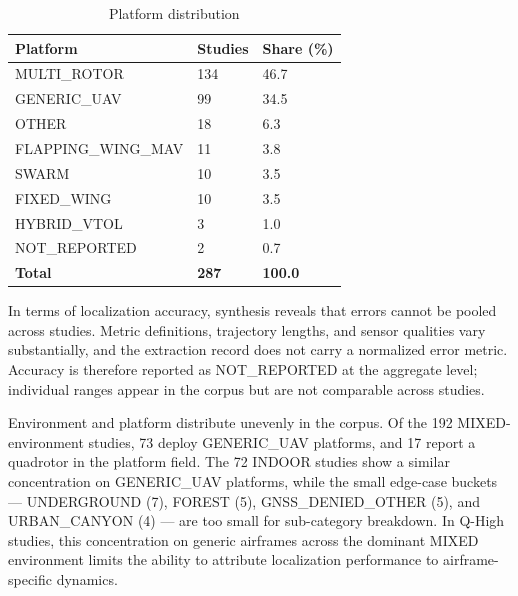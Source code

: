 \documentclass[conference]{IEEEtran}
\begin{document}
\begin{table}[htbp]
\centering
\caption{Platform distribution}
\label{tab:4}
\begin{tabular}{l l l}
\hline
Platform & Studies & Share (\%) \\
\hline
MULTI\_ROTOR & 134 & 46.7 \\
\hline
GENERIC\_UAV & 99 & 34.5 \\
\hline
OTHER & 18 & 6.3 \\
\hline
FLAPPING\_WING\_MAV & 11 & 3.8 \\
\hline
SWARM & 10 & 3.5 \\
\hline
FIXED\_WING & 10 & 3.5 \\
\hline
HYBRID\_VTOL & 3 & 1.0 \\
\hline
NOT\_REPORTED & 2 & 0.7 \\
\hline
\textbf{Total} & \textbf{287} & \textbf{100.0} \\
\hline
\end{tabular}
\end{table}




In terms of localization accuracy, synthesis reveals that errors cannot be pooled across studies. Metric definitions, trajectory lengths, and sensor qualities vary substantially, and the extraction record does not carry a normalized error metric. Accuracy is therefore reported as NOT\_REPORTED at the aggregate level; individual ranges appear in the corpus but are not comparable across studies.

Environment and platform distribute unevenly in the corpus. Of the 192 MIXED-environment studies, 73 deploy GENERIC\_UAV platforms, and 17 report a quadrotor in the platform field. The 72 INDOOR studies show a similar concentration on GENERIC\_UAV platforms, while the small edge-case buckets — UNDERGROUND (7), FOREST (5), GNSS\_DENIED\_OTHER (5), and URBAN\_CANYON (4) — are too small for sub-category breakdown. In Q-High studies, this concentration on generic airframes across the dominant MIXED environment limits the ability to attribute localization performance to airframe-specific dynamics.
\end{document}
